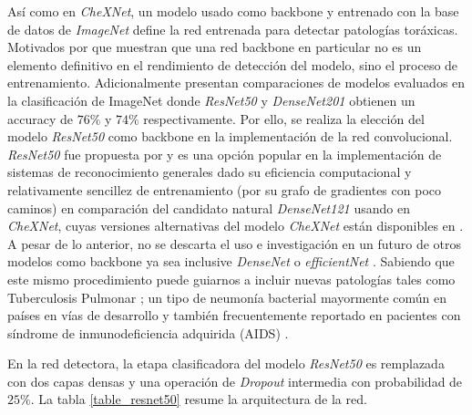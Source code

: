 {Así como en \textit{CheXNet}, un modelo usado como backbone y entrenado con la base de datos de
\textit{ImageNet} define la red entrenada para detectar patologías toráxicas. Motivados por
\citeauthor{bressem2020comparing, shazia2021comparative} que muestran que una red backbone en
particular no es un elemento definitivo en el rendimiento de detección del modelo, sino el proceso
de entrenamiento. Adicionalmente \citeauthor{huang2017densely, luo2020comparison} presentan
comparaciones de modelos evaluados en la clasificación de ImageNet donde \textit{ResNet50} y
\textit{DenseNet201} obtienen un accuracy de $76\%$ y $74\%$ respectivamente. Por ello, se realiza
la elección del modelo \textit{ResNet50} como backbone en la implementación de la red convolucional.
\textit{ResNet50} fue propuesta por \citeauthor{he2016deep} y es una opción popular en la
implementación de sistemas de reconocimiento generales dado su eficiencia computacional y relativamente
sencillez de entrenamiento (por su grafo de gradientes con poco caminos) en comparación del candidato
natural \textit{DenseNet121} usando en \textit{CheXNet}, cuyas versiones alternativas del modelo
\textit{CheXNet} están disponibles en \cite{chexnet_code}. A pesar de lo anterior, no se descarta el uso
e investigación en un futuro de otros modelos como backbone ya sea inclusive \textit{DenseNet} o
\textit{efficientNet} \cite{tan2019efficientnet}. Sabiendo que este mismo procedimiento puede
guiarnos a incluir nuevas patologías tales como Tuberculosis Pulmonar \cite{stirenko2018chest}; un
tipo de neumonía bacterial mayormente común en países en vías de desarrollo y también frecuentemente
reportado en pacientes con síndrome de inmunodeficiencia adquirida (AIDS) \cite{matsuura2018tuberculous}.

En la red detectora, la etapa clasificadora del modelo \textit{ResNet50} es remplazada con dos capas
densas y una operación de \textit{Dropout} intermedia con probabilidad de $25\%$. La tabla
\ref{table_resnet50} resume la arquitectura de la red.

}
